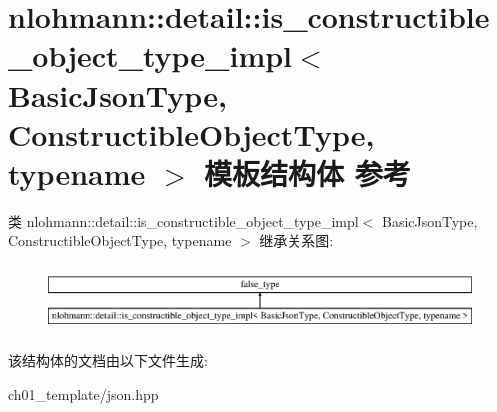 \hypertarget{structnlohmann_1_1detail_1_1is__constructible__object__type__impl}{}\section{nlohmann\+::detail\+::is\+\_\+constructible\+\_\+object\+\_\+type\+\_\+impl$<$ Basic\+Json\+Type, Constructible\+Object\+Type, typename $>$ 模板结构体 参考}
\label{structnlohmann_1_1detail_1_1is__constructible__object__type__impl}
类 nlohmann\+::detail\+::is\+\_\+constructible\+\_\+object\+\_\+type\+\_\+impl$<$ Basic\+Json\+Type, Constructible\+Object\+Type, typename $>$ 继承关系图\+:\begin{figure}[H]
\begin{center}
\leavevmode
\includegraphics[height=1.789137cm]{structnlohmann_1_1detail_1_1is__constructible__object__type__impl}
\end{center}
\end{figure}


该结构体的文档由以下文件生成\+:\begin{DoxyCompactItemize}
\item 
ch01\+\_\+template/json.\+hpp\end{DoxyCompactItemize}
